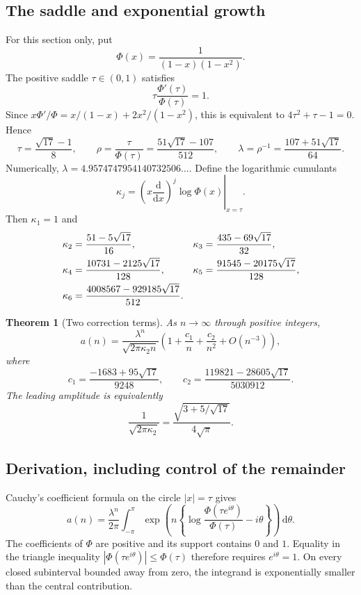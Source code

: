 \documentclass[11pt,a4paper]{article}
\numberwithin{equation}{section}
\newtheorem{theorem}{Theorem}[section]
\theoremstyle{definition}
\theoremstyle{remark}
\newcommand{\dd}{\,\mathrm d}
\begin{document}
\subsection{The saddle and exponential growth}
For this section only, put
\[
 \Phi(x)=\frac1{(1-x)(1-x^2)}.
\]
The positive saddle $\tau\in(0,1)$ satisfies
\[
 \tau\frac{\Phi'(\tau)}{\Phi(\tau)}=1.
\]
Since $x\Phi'/\Phi=x/(1-x)+2x^2/(1-x^2)$, this is equivalent to
$4\tau^2+\tau-1=0$. Hence
\begin{equation}\label{eq:saddle}
 \tau=\frac{\sqrt{17}-1}{8},\qquad
 \rho=\frac{\tau}{\Phi(\tau)}
 =\frac{51\sqrt{17}-107}{512},\qquad
 \lambda=\rho^{-1}=\frac{107+51\sqrt{17}}{64}.
\end{equation}
Numerically, $\lambda=4.9574747954140732506\ldots$.
Define the logarithmic cumulants
\begin{equation}\label{eq:kappa}
 \kappa_j=\left.
 \left(x\frac{\mathrm d}{\mathrm dx}\right)^j\log\Phi(x)
 \right|_{x=\tau}.
\end{equation}
Then $\kappa_1=1$ and
\begin{align}\label{eq:kappas}
 \kappa_2&=\frac{51-5\sqrt{17}}{16},&
 \kappa_3&=\frac{435-69\sqrt{17}}{32},\notag\\
 \kappa_4&=\frac{10731-2125\sqrt{17}}{128},&
 \kappa_5&=\frac{91545-20175\sqrt{17}}{128},\notag\\
 \kappa_6&=\frac{4008567-929185\sqrt{17}}{512}.&&
\end{align}

\begin{theorem}[Two correction terms]\label{thm:asymptotic}
As $n\to\infty$ through positive integers,
\begin{equation}\label{eq:asymptotic}
 a(n)=\frac{\lambda^n}{\sqrt{2\pi\kappa_2n}}
 \left(1+\frac{c_1}{n}+\frac{c_2}{n^2}+O(n^{-3})\right),
\end{equation}
where
\begin{equation}\label{eq:c1c2}
 c_1=\frac{-1683+95\sqrt{17}}{9248},\qquad
 c_2=\frac{119821-28605\sqrt{17}}{5030912}.
\end{equation}
The leading amplitude is equivalently
\begin{equation}\label{eq:amplitude}
 \frac1{\sqrt{2\pi\kappa_2}}=
 \frac{\sqrt{3+5/\sqrt{17}}}{4\sqrt\pi}.
\end{equation}
\end{theorem}

\subsection{Derivation, including control of the remainder}
Cauchy's coefficient formula on the circle $|x|=\tau$ gives
\begin{equation}\label{eq:cauchy}
 a(n)=\frac{\lambda^n}{2\pi}
 \int_{-\pi}^{\pi}
 \exp\left(n\left\{
 \log\frac{\Phi(\tau e^{i\theta})}{\Phi(\tau)}-i\theta
 \right\}\right)\dd\theta.
\end{equation}
The coefficients of $\Phi$ are positive and its support contains $0$ and
$1$. Equality in the triangle inequality
$|\Phi(\tau e^{i\theta})|\le\Phi(\tau)$ therefore requires
$e^{i\theta}=1$. On every closed subinterval bounded away from zero, the
integrand is exponentially smaller than the central contribution.
\end{document}
